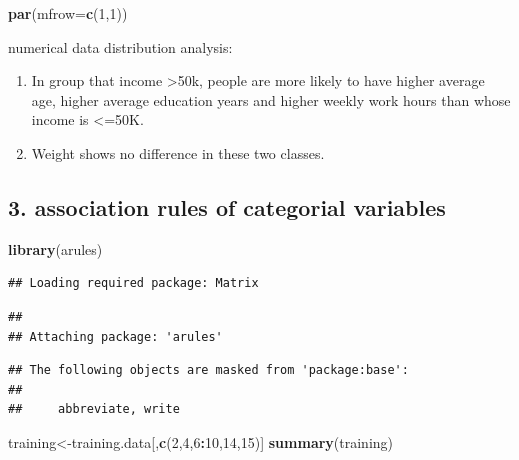 \documentclass[]{article}
\newenvironment{Shaded}{\begin{snugshade}}{\end{snugshade}}
\newcommand{\KeywordTok}[1]{\textcolor[rgb]{0.13,0.29,0.53}{\textbf{#1}}}
\newcommand{\DataTypeTok}[1]{\textcolor[rgb]{0.13,0.29,0.53}{#1}}
\newcommand{\DecValTok}[1]{\textcolor[rgb]{0.00,0.00,0.81}{#1}}
\newcommand{\OperatorTok}[1]{\textcolor[rgb]{0.81,0.36,0.00}{\textbf{#1}}}
\newcommand{\NormalTok}[1]{#1}
\begin{document}
\begin{Shaded}
\begin{Highlighting}[]
\KeywordTok{par}\NormalTok{(}\DataTypeTok{mfrow=}\KeywordTok{c}\NormalTok{(}\DecValTok{1}\NormalTok{,}\DecValTok{1}\NormalTok{))}
\end{Highlighting}
\end{Shaded}

numerical data distribution analysis:

\begin{enumerate}
\def\labelenumi{\arabic{enumi}.}
\item
  In group that income \textgreater{}50k, people are more likely to have
  higher average age, higher average education years and higher weekly
  work hours than whose income is \textless{}=50K.
\item
  Weight shows no difference in these two classes.
\end{enumerate}

\subsection{3. association rules of categorial
variables}\label{association-rules-of-categorial-variables}

\begin{Shaded}
\begin{Highlighting}[]
\KeywordTok{library}\NormalTok{(arules)}
\end{Highlighting}
\end{Shaded}

\begin{verbatim}
## Loading required package: Matrix
\end{verbatim}

\begin{verbatim}
## 
## Attaching package: 'arules'
\end{verbatim}

\begin{verbatim}
## The following objects are masked from 'package:base':
## 
##     abbreviate, write
\end{verbatim}

\begin{Shaded}
\begin{Highlighting}[]
\NormalTok{training<-training.data[,}\KeywordTok{c}\NormalTok{(}\DecValTok{2}\NormalTok{,}\DecValTok{4}\NormalTok{,}\DecValTok{6}\OperatorTok{:}\DecValTok{10}\NormalTok{,}\DecValTok{14}\NormalTok{,}\DecValTok{15}\NormalTok{)]}
\KeywordTok{summary}\NormalTok{(training)}
\end{Highlighting}
\end{Shaded}
\end{document}
